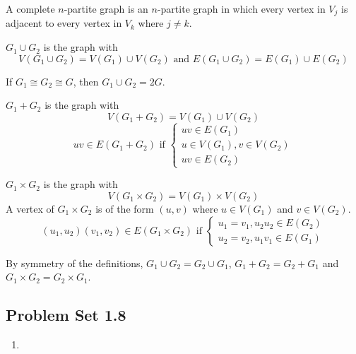 \begin{definition}
	A complete $n$-partite graph is an $n$-partite graph in which every vertex in $V_j$ is adjacent to every vertex in $V_k$ where $j \ne k$.
\end{definition}

\begin{definition}[union]
	$G_1 \cup G_2$ is the graph with 
	$$ V(G_1 \cup G_2) = V(G_1) \cup V(G_2) \text{ and }E(G_1 \cup G_2) = E(G_1) \cup E(G_2) $$
\end{definition}
\begin{remark}
	If $G_1 \cong G_2 \cong G$, then $G_1 \cup G_2 = 2G$.
\end{remark}

\begin{definition}[join]
	$G_1+G_2$ is the graph with	
	$$ V(G_1+G_2) = V(G_1) \cup V(G_2) $$
	$$ uv \in E(G_1+G_2) \text{ if } \begin{cases} uv \in E(G_1) \\ u \in V(G_1), v \in V(G_2) \\ uv \in E(G_2) \end{cases} $$
\end{definition}

\begin{definition}[product]
	$G_1 \times G_2$ is the graph with
	$$ V(G_1 \times G_2) = V(G_1) \times V(G_2) $$
	A vertex of $G_1 \times G_2$ is of the form $(u,v)$ where $u \in V(G_1)$ and $v \in V(G_2)$.
	$$ (u_1,u_2)(v_1,v_2) \in E(G_1 \times G_2) \text{ if } \begin{cases} u_1 = v_1, u_2u_2 \in E(G_2) \\ u_2 = v_2, u_1v_1 \in E(G_1) \end{cases} $$
\end{definition}

\begin{remark}
	By symmetry of the definitions, $G_1 \cup G_2 = G_2 \cup G_1$, $G_1 + G_2 = G_2 + G_1$ and $G_1 \times G_2 = G_2 \times G_1$.
\end{remark}
\subsection*{Problem Set 1.8}

\begin{enumerate}
	\item
\end{enumerate}

